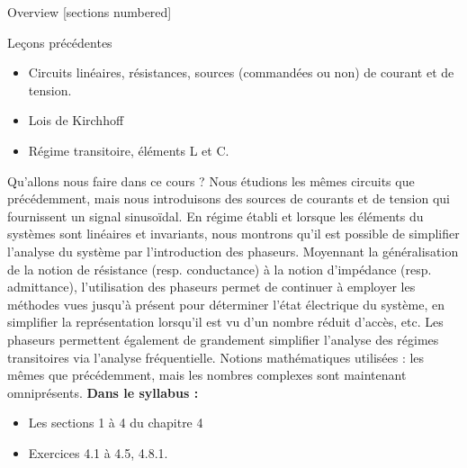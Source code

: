 \titleframe

\begin{frame}{Overview}
  [sections numbered]
  \tableofcontents[hideallsubsections]
\end{frame}





\begin{frame} {Leçons précédentes}
	\begin{itemize}
	\item Circuits linéaires, résistances, sources (commandées ou non) de courant et de tension.
	\item Lois de Kirchhoff
	\item Régime transitoire, éléments L et C.
	\end{itemize}
	\vfill
\end{frame}

\begin{frame}[allowframebreaks]{Qu'allons nous faire dans ce cours ?}
	Nous étudions les mêmes circuits que précédemment, mais nous introduisons des sources de courants et de tension qui fournissent un signal sinusoïdal. 
	\vfill 
	En régime établi et lorsque les éléments du systèmes sont linéaires et invariants, nous montrons qu'il est possible de simplifier l'analyse du système par l'introduction des phaseurs. 
	\vfill 	
	Moyennant la généralisation de la notion de résistance (resp. conductance) à la notion d'impédance (resp. admittance),  l'utilisation des phaseurs permet de continuer à employer les méthodes vues jusqu'à présent pour déterminer l'état électrique du système, en simplifier la représentation lorsqu'il est vu d'un nombre réduit d'accès, etc. Les phaseurs permettent également de grandement simplifier l'analyse des régimes transitoires via l'analyse fréquentielle.
	\vfill 
	Notions mathématiques utilisées : les mêmes que précédemment, mais les nombres complexes sont maintenant omniprésents.
	\vfill 
	\textbf{Dans le syllabus : }
\begin{itemize}
  \item Les sections 1 à 4 du chapitre 4
  \item Exercices 4.1 à 4.5, 4.8.1.
\end{itemize}
\end{frame}



